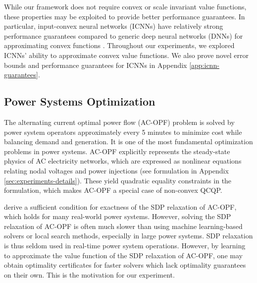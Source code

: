 \documentclass[10pt]{article} %
\theoremstyle{plain}
\theoremstyle{definition}
\theoremstyle{remark}
\begin{document}
While our framework does not require convex or scale invariant value functions, these properties may be exploited to provide better performance guarantees. In particular, input-convex neural networks (ICNNs) \citep{pmlr-v70-amos17b} have relatively strong performance guarantees compared to generic deep neural networks (DNNs) for approximating convex functions \cite{rosemberg2024learning}. Throughout our experiments, we explored ICNNs' ability to approximate convex value functions. We also prove novel error bounds and performance guarantees for ICNNs in Appendix \ref{app:icnn-guarantees}.

\subsection{Power Systems Optimization}

The alternating current optimal power flow (AC-OPF) problem is solved by power system operators approximately every 5 minutes to minimize cost while balancing demand and generation. It is one of the most fundamental optimization problems in power systems. AC-OPF explicitly represents the steady-state physics of AC electricity networks, which are expressed as nonlinear equations relating nodal voltages and power injections (see formulation in Appendix \ref{sec:experiments-details}). These yield quadratic equality constraints in the formulation, which makes AC-OPF a special case of non-convex QCQP.

\citet{lavaei2012zero} derive a sufficient condition for exactness of the SDP relaxation of AC-OPF, which holds for many real-world power systems. However, solving the SDP relaxation of AC-OPF is often much slower than using machine learning-based solvers or local search methods, especially in large power systems. SDP relaxation is thus seldom used in real-time power system operations. However, by learning to approximate the value function of the SDP relaxation of AC-OPF, one may obtain optimality certificates for faster solvers which lack optimality guarantees on their own. This is the motivation for our experiment.
\end{document}
